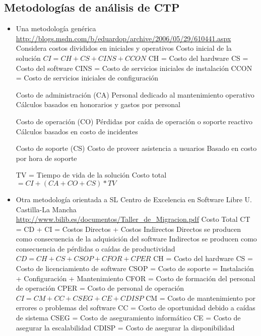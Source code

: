 \subsection {Metodologías de análisis de CTP}
\begin{itemize}
	\item Una metodología genérica
	\subitem \url{http://blogs.msdn.com/b/eduardop/archive/2006/05/29/610441.aspx}
	\subitem Considera costos divididos en iniciales y operativos
	\subitem Costo inicial de la solución ${CI = CH + CS + CINS + CCON}$
	\subsubitem CH = Costo del hardware
	\subsubitem CS = Costo del software
	\subsubitem CINS = Costo de servicios iniciales de instalación
	\subsubitem CCON = Costo de servicios iniciales de configuración

	\subitem Costo de administración (CA)
	\subsubitem Personal dedicado al mantenimiento operativo
	\subsubitem Cálculos basados en honorarios y gastos por personal

	\subitem Costo de operación (CO)
	\subsubitem Pérdidas por caída de operación o soporte reactivo
	\subsubitem Cálculos basados en costo de incidentes

	\subitem Costo de soporte (CS)
	\subsubitem Costo de proveer asistencia a usuarios
	\subsubitem Basado en costo por hora de soporte
	
	\subitem TV = Tiempo de vida de la solución
	\subitem Costo total ${= CI + (CA + CO + CS) * TV}$


	\item Otra metodología orientada a SL
	\subitem Centro de Excelencia en Software Libre U. Castilla-La Mancha
	\subitem \url {http://www.bilib.es/documentos/Taller_de_Migracion.pdf}
	\subitem Costo Total CT = CD + CI = Costos Directos + Costos Indirectos
	\subsubitem Directos se producen como consecuencia de la adquisición del software
	\subsubitem Indirectos se producen como consecuencia de pérdidas o caídas de productividad
	\subitem ${CD = CH + CS + CSOP + CFOR + CPER}$
	\subsubitem CH = Costo del hardware
	\subsubitem CS = Costo de licenciamiento de software
	\subsubitem CSOP = Costo de soporte = Instalación + Configuración + Mantenimiento
	\subsubitem CFOR = Costo de formación del personal de operación
	\subsubitem CPER = Costo de personal de operación
	\subitem ${CI = CM + CC + CSEG + CE + CDISP}$
	\subsubitem CM = Costo de mantenimiento por errores o problemas del software
	\subsubitem CC = Costo de oportunidad debido a caídas de sistema
	\subsubitem CSEG = Costo de aseguramiento informático
	\subsubitem CE = Costo de asegurar la escalabilidad
	\subsubitem CDISP = Costo de asegurar la disponibilidad

\end{itemize}